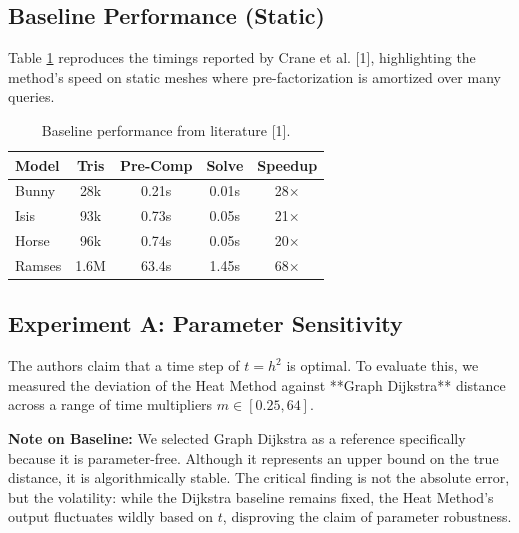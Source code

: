 \documentclass[11pt,a4paper]{article}
\begin{document}
\subsection{Baseline Performance (Static)}
Table \ref{tab:method_comparison} reproduces the timings reported by Crane et al. [1], highlighting the method's speed on static meshes where pre-factorization is amortized over many queries.

\begin{table}[t!]
\centering
\small
\begin{tabular}{@{}lcccc@{}}
\toprule
\textbf{Model} & \textbf{Tris} & \textbf{Pre-Comp} & \textbf{Solve} & \textbf{Speedup} \\
\midrule
Bunny & 28k & 0.21s & 0.01s & 28$\times$ \\
Isis & 93k & 0.73s & 0.05s & 21$\times$ \\
Horse & 96k & 0.74s & 0.05s & 20$\times$ \\
Ramses & 1.6M & 63.4s & 1.45s & 68$\times$ \\
\bottomrule
\end{tabular}
\caption{Baseline performance from literature [1].}
\label{tab:method_comparison}
\end{table}

\subsection{Experiment A: Parameter Sensitivity}
The authors claim that a time step of $t = h^2$ is optimal. To evaluate this, we measured the deviation of the Heat Method against **Graph Dijkstra** distance across a range of time multipliers $m \in [0.25, 64]$. 

\textbf{Note on Baseline:} We selected Graph Dijkstra as a reference specifically because it is parameter-free. Although it represents an upper bound on the true distance, it is algorithmically stable. The critical finding is not the absolute error, but the volatility: while the Dijkstra baseline remains fixed, the Heat Method's output fluctuates wildly based on $t$, disproving the claim of parameter robustness.
\end{document}
